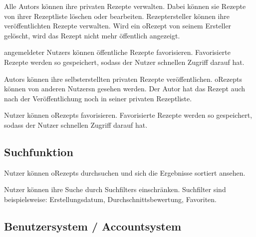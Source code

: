Alle \glspl{Autor} können ihre privaten Rezepte verwalten. Dabei können sie Rezepte von ihrer Rezeptliste löschen oder bearbeiten.\newline
Rezeptersteller können ihre veröffentlichten Rezepte verwalten. Wird ein \gls{oRezept} von seinem Ersteller gelöscht, wird das Rezept nicht mehr öffentlich angezeigt.

\Glspl{angemeldeter Nutzer} können öffentliche Rezepte favorisieren. Favorisierte Rezepte werden so gespeichert, sodass der Nutzer schnellen Zugriff darauf hat.

\glspl{Autor} können ihre selbsterstellten privaten Rezepte  veröffentlichen. \Glspl{oRezept} können von anderen \glspl{Nutzer}n gesehen werden. Der \gls{Autor} hat das Rezept auch nach der Veröffentlichung noch in seiner privaten \gls{Rezeptliste}.

Nutzer können \glspl{oRezept} favorisieren. Favorisierte Rezepte werden so gespeichert, sodass der \gls{Nutzer} schnellen Zugriff darauf hat.


\subsection{Suchfunktion}

\gls{Nutzer} können \glspl{oRezept} durchsuchen und sich die Ergebnisse sortiert ansehen.

\gls{Nutzer} können ihre Suche durch \glspl{Suchfilter} einschränken. \gls{Suchfilter} sind beispielsweise: Erstellungsdatum, Durchschnittsbewertung, Favoriten.

	
	
\subsection{Benutzersystem / Accountsystem}

